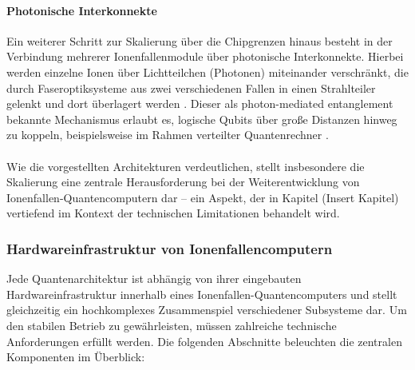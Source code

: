 \medskip

\paragraph{Photonische Interkonnekte}

Ein weiterer Schritt zur Skalierung über die Chipgrenzen hinaus besteht in der Verbindung mehrerer Ionenfallenmodule über photonische Interkonnekte. Hierbei werden einzelne Ionen über Lichtteilchen (Photonen) miteinander verschränkt, die durch Faseroptiksysteme aus zwei verschiedenen Fallen in einen Strahlteiler gelenkt und dort überlagert werden \cite{strohm2024}. Dieser als photon-mediated entanglement bekannte Mechanismus erlaubt es, logische Qubits über große Distanzen hinweg zu koppeln, beispielsweise im Rahmen verteilter Quantenrechner \cite{strohm2024}.
\\\\
Wie die vorgestellten Architekturen verdeutlichen, stellt insbesondere die Skalierung eine zentrale Herausforderung bei der Weiterentwicklung von Ionenfallen-Quantencomputern dar – ein Aspekt, der in Kapitel (Insert Kapitel) vertiefend im Kontext der technischen Limitationen behandelt wird.

\subsubsection{Hardwareinfrastruktur von Ionenfallencomputern}
Jede Quantenarchitektur ist abhängig von ihrer eingebauten Hardwareinfrastruktur innerhalb eines Ionenfallen-Quantencomputers und stellt gleichzeitig ein hochkomplexes Zusammenspiel verschiedener Subsysteme dar. Um den stabilen Betrieb zu gewährleisten, müssen zahlreiche technische Anforderungen erfüllt werden. Die folgenden Abschnitte beleuchten die zentralen Komponenten im Überblick: \\

